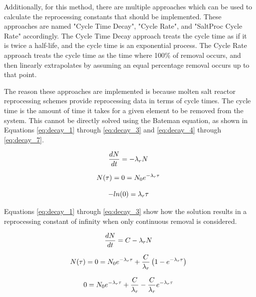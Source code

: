 Additionally, for this method, there are multiple approaches which can be used to calculate the reprocessing constants that should be implemented. These approaches are named "Cycle Time Decay", "Cycle Rate", and "SaltProc Cycle Rate" accordingly. The Cycle Time Decay approach treats the cycle time as if it is twice a half-life, and the cycle time is an exponential process. The Cycle Rate approach treats the cycle time as the time where 100\% of removal occurs, and then linearly extrapolates by assuming an equal percentage removal occurs up to that point.

The reason these approaches are implemented is because molten salt reactor reprocessing schemes provide reprocessing data in terms of cycle times. The cycle time is the amount of time it takes for a given element to be removed from the system. This cannot be directly solved using the Bateman equation, as shown in Equations \eqref{eq:decay_1} through \eqref{eq:decay_3} and \eqref{eq:decay_4} through \eqref{eq:decay_7}. 

\begin{equation} \hfill
\frac{dN}{dt} = -\lambda_r N
\hfill\label{eq:decay_1} \end{equation}

\begin{equation} \hfill
N(\tau) = 0 = N_0 e^{-\lambda_r \tau}
\hfill\label{eq:decay_2} \end{equation}

\begin{equation} \hfill
-ln(0) = \lambda_r \tau
\hfill\label{eq:decay_3} \end{equation}

Equations \eqref{eq:decay_1} through \eqref{eq:decay_3} show how the solution results in a reprocessing constant of infinity when only continuous removal is considered.

\begin{equation} \hfill
\frac{dN}{dt} = C -\lambda_r N
\hfill\label{eq:decay_4} \end{equation}

\begin{equation} \hfill
N(\tau) = 0 = N_0 e^{-\lambda_r \tau} + \frac{C}{\lambda_r} \left( 1 - e^{-\lambda_r \tau} \right)
\hfill\label{eq:decay_5} \end{equation}

\begin{equation} \hfill
0 = N_0 e^{-\lambda_r \tau} + \frac{C}{\lambda_r} - \frac{C}{\lambda_r} e^{-\lambda_r \tau}
\hfill\label{eq:decay_6} \end{equation}

